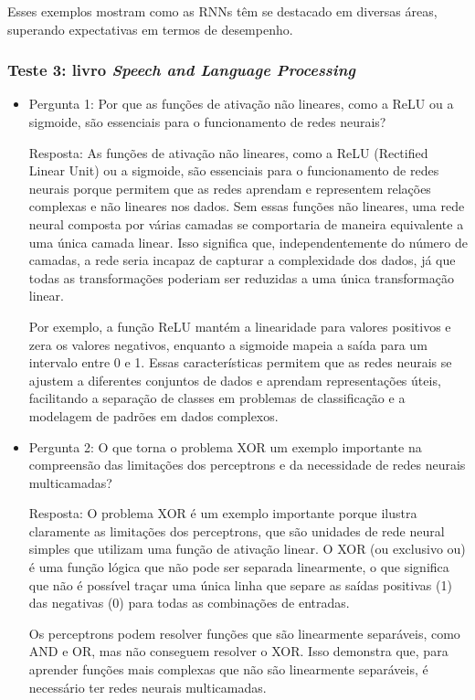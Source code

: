 \documentclass[12 pt]{article}
\begin{document}
\begin{itemize}
    Esses exemplos mostram como as RNNs têm se destacado em diversas áreas, superando expectativas em termos de desempenho.
\end{itemize}

\subsubsection*{Teste 3: livro \textit{Speech and Language Processing}}
\begin{itemize}
    \item Pergunta 1: Por que as funções de ativação não lineares, como a ReLU ou a sigmoide, são essenciais para o funcionamento de redes neurais?

    Resposta: As funções de ativação não lineares, como a ReLU (Rectified Linear Unit) ou a sigmoide, são essenciais para o funcionamento de redes neurais porque permitem que as redes aprendam e representem relações complexas e não lineares nos dados. Sem essas funções não lineares, uma rede neural composta por várias camadas se comportaria de maneira equivalente a 
    uma única camada linear. Isso significa que, independentemente do número de camadas, a rede seria incapaz de capturar a complexidade dos dados, já que todas as transformações poderiam ser reduzidas a uma única transformação linear.
    
    Por exemplo, a função ReLU mantém a linearidade para valores positivos e zera os valores negativos, enquanto a sigmoide mapeia a saída para um intervalo entre 0 e 1. Essas características permitem que as redes neurais se ajustem a diferentes conjuntos de dados e aprendam representações úteis, facilitando a separação de classes em problemas de classificação e a modelagem de padrões em dados complexos.

    \item Pergunta 2: O que torna o problema XOR um exemplo importante na compreensão das limitações 
    dos perceptrons e da necessidade de redes neurais multicamadas?
    
    Resposta: O problema XOR é um exemplo importante porque ilustra claramente as limitações dos perceptrons, que são unidades de rede neural simples que utilizam uma função de ativação 
    linear. O XOR (ou exclusivo ou) é uma função lógica que não pode ser separada linearmente, o que significa que não é possível traçar uma única linha que separe as saídas positivas (1) das negativas (0) para todas as combinações de entradas.  
    
    Os perceptrons podem resolver funções que são linearmente separáveis, como AND e OR, mas não conseguem resolver o XOR. Isso demonstra que, para aprender funções mais complexas que não são linearmente separáveis, é necessário ter redes neurais multicamadas.
    

\end{itemize}
\end{document}
